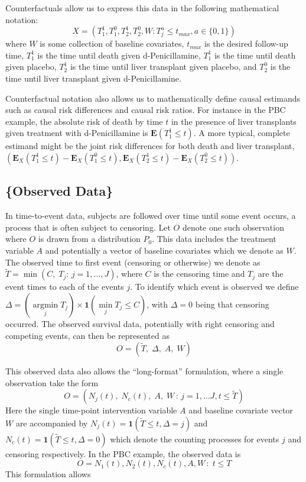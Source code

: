 \documentclass{report}
\DeclareMathOperator*{\argmin}{argmin}
\newcommand{\1}{\ensuremath{\mathbf{1}}}
\newcommand{\T}{\ensuremath{\widetilde{T}}}
\renewcommand{\L}{\ensuremath{W}}
\begin{document}
Counterfactuals allow us to express this data in the following mathematical notation:
\[ X = (T^1_1, T^0_1, T^1_2, T^0_2, \L : T^a_j \leq t_{max},  a \in \{0, 1\}) \]
where \(\L\) is some collection of baseline covariates, \(t_{max}\) is the desired follow-up time, \(T^1_1\) is the time until death given d-Penicillamine, \(T^1_1\) is the time until death given placebo, \(T^1_2\) is the time until liver transplant given placebo, and \(T^0_2\) is the time until liver transplant given d-Penicillamine.

Counterfactual notation also allows us to mathematically define causal estimands such as causal risk differences and causal risk ratios. For instance in the PBC example, the absolute risk of death by time \(t\) in the presence of liver transplants given treatment with d-Penicillamine is \(\mathbf{E}(T^1_1 \leq t)\). A more typical, complete estimand might be the joint risk differences for both death and liver transplant, \(\left(\mathbf{E}_X(T^1_1 \leq t) - \mathbf{E}_X(T^0_1 \leq t), \mathbf{E}_X(T^1_2 \leq t) - \mathbf{E}_X(T^0_2 \leq t)\right)\). 

\subsection{\{Observed Data\}}
\label{sec:org722e163}
In time-to-event data, subjects are followed over time until some event occurs, a process that is often subject to censoring. Let \(O\) denote one such observation where \(O\) is drawn from a distribution \(P_0\). This data includes the treatment variable \(A\) and potentially a vector of baseline covariates which we denote as \(\L\). The observed time to first event (censoring or otherwise) we denote as \(\T = \min(C,\; T_j :\, j = 1, \dots, J)\), where \(C\) is the censoring time and \(T_j\) are the event times to each of the events \(j\). To identify which event is observed we define \(\Delta = (\argmin\limits_j T_j) \times \1(\min\limits_j T_j \leq C)\), with \(\Delta = 0\) being that censoring occurred. The observed survival data, potentially with right censoring and competing events, can then be represented as 
\[O = (\T,\;\Delta,\;A,\;\L)\]

This observed data also allows the ``long-format'' formulation, where a single observation take the form
\[O = (N_j(t),\;N_c(t),\;A,\;\L\,:\, j = 1, \dots J, t \leq \T)\]
Here the single time-point intervention variable \(A\) and baseline covariate vector \(\L\) are accompanied by \(N_j(t) = \1(\T \leq t, \Delta = j)\) and \(N_c(t) = \1(\T \leq t, \Delta = 0)\) which denote the counting processes for events \(j\) and censoring respectively. In the PBC example, the observed data is
\[ O = N_1(t), N_2(t), N_c(t), A, \L \,:\; t \leq T \]
This formulation allows 
\end{document}
